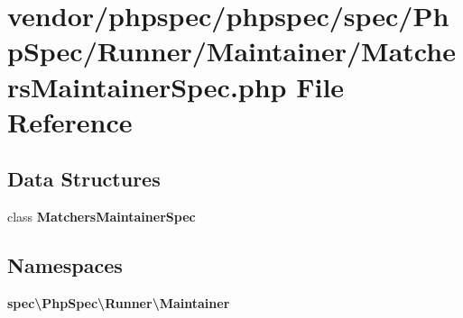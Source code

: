 \section{vendor/phpspec/phpspec/spec/\+Php\+Spec/\+Runner/\+Maintainer/\+Matchers\+Maintainer\+Spec.php File Reference}
\label{_matchers_maintainer_spec_8php}
\subsection*{Data Structures}
\begin{DoxyCompactItemize}
\item 
class {\bf Matchers\+Maintainer\+Spec}
\end{DoxyCompactItemize}
\subsection*{Namespaces}
\begin{DoxyCompactItemize}
\item 
 {\bf spec\textbackslash{}\+Php\+Spec\textbackslash{}\+Runner\textbackslash{}\+Maintainer}
\end{DoxyCompactItemize}
